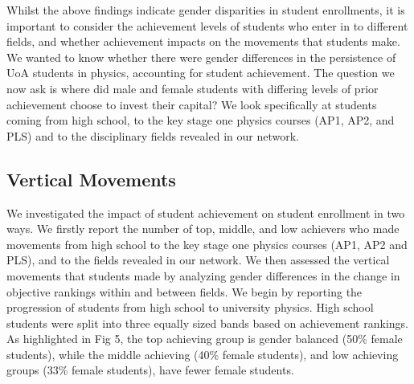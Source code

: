 Whilst the above findings indicate gender disparities in student enrollments, it is important to consider the achievement levels of students who enter in to different fields, and whether achievement impacts on the movements that students make. We wanted to know whether there were gender differences in the persistence of UoA students in physics, accounting for student achievement. The question we now ask is where did male and female students with differing levels of prior achievement choose to invest their capital? We look specifically at students coming from high school, to the key stage one physics courses (AP1, AP2, and PLS) and to the disciplinary fields revealed in our network. 

\subsection{Vertical Movements}
We investigated the impact of student achievement on student enrollment in two ways. We firstly report the number of top, middle, and low achievers who made movements from high school to the key stage one physics courses (AP1, AP2 and PLS), and to the fields revealed in our network. We then assessed the vertical movements that students made by analyzing gender differences in the change in objective rankings within and between fields. We begin by reporting the progression of students from high school to university physics. High school students were split into three equally sized bands based on achievement rankings. As highlighted in Fig 5, the top achieving group is gender balanced (50\% female students), while the middle achieving (40\% female students), and low achieving groups (33\% female students), have fewer female students. 


